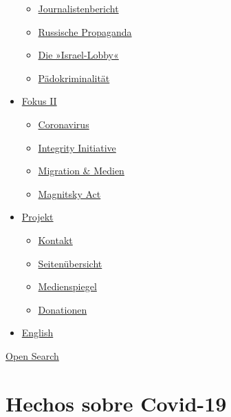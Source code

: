 \begin{itemize}
  \begin{itemize}
  \tightlist
  \item
    \href{https://swprs.org/bericht-eines-journalisten/}{Journalistenbericht}
  \item
    \href{https://swprs.org/russische-propaganda/}{Russische Propaganda}
  \item
    \href{https://swprs.org/die-israel-lobby-fakten-und-mythen/}{Die
    »Israel-Lobby«}
  \item
    \href{https://swprs.org/geopolitik-und-paedokriminalitaet/}{Pädokriminalität}
  \end{itemize}
\item
  \href{https://swprs.org/migration-und-medien/}{Fokus II}

  \begin{itemize}
  \tightlist
  \item
    \href{https://swprs.org/covid-19-hinweis-ii/}{Coronavirus}
  \item
    \href{https://swprs.org/die-integrity-initiative/}{Integrity
    Initiative}
  \item
    \href{https://swprs.org/migration-und-medien/}{Migration \& Medien}
  \item
    \href{https://swprs.org/der-fall-magnitsky/}{Magnitsky Act}
  \end{itemize}
\item
  \href{https://swprs.org/kontakt/}{Projekt}

  \begin{itemize}
  \tightlist
  \item
    \href{https://swprs.org/kontakt/}{Kontakt}
  \item
    \href{https://swprs.org/uebersicht/}{Seitenübersicht}
  \item
    \href{https://swprs.org/medienspiegel/}{Medienspiegel}
  \item
    \href{https://swprs.org/donationen/}{Donationen}
  \end{itemize}
\item
  \href{https://swprs.org/contact/}{English}
\end{itemize}

\protect\hyperlink{}{Open Search}

\hypertarget{hechos-sobre-covid-19}{%
\section{Hechos sobre Covid-19}\label{hechos-sobre-covid-19}}

